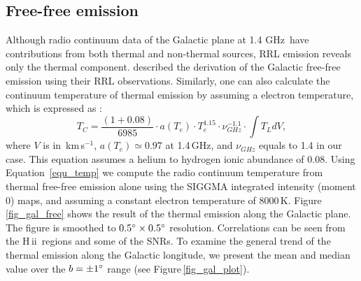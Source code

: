 \documentclass[manuscript]{aastex61}
\newcommand{\hii}{{\rm H\,}{{\sc ii}}}
\newcommand{\kms}{\,km\,s$^{-1}$}
\newcommand{\ghz}{\,GHz}
\begin{document}
\subsection{Free-free emission} \label{sec_gal_free}
Although radio continuum data of the Galactic plane at 1.4\,\ghz\ have contributions from both thermal and non-thermal sources, RRL emission reveals only the thermal component.
\citet{Alves2012} described the derivation of the Galactic free-free emission using their RRL observations.
Similarly, one can also calculate the continuum temperature of thermal emission by assuming a electron temperature, which is expressed as \citep{Mezger1967a, Lockman1978, Quireza2006a}:
\begin{equation}
  T_C=
  \frac{(1+0.08)}{6985}\cdot a(T_e) \cdot T_e^{1.15} \cdot \nu _{GHz}^{-1.1} \cdot \int T_L dV,
  \label{equ_temp}
\end{equation}
where $V$ is in \kms, $a(T_e) \simeq 0.97$ at 1.4\,GHz, and $\nu_{GHz}$ equals to 1.4 in our case.  This equation assumes a helium to hydrogen ionic abundance of 0.08.
Using Equation~\ref{equ_temp} we compute the radio continuum temperature from thermal free-free emission alone using the SIGGMA integrated intensity (moment 0) maps, and assuming a constant electron temperature of 8000\,K.
Figure\,\ref{fig_gal_free} shows the result of the thermal emission along the Galactic plane.
The figure is smoothed to $0.5\mbox{$^\circ$} \times 0.5\mbox{$^\circ$}$ resolution.
Correlations can be seen from the \hii\ regions and some of the SNRs.
To examine the general trend of the thermal emission along the Galactic longitude, we present the mean and median value over the $b=\pm1\mbox{$^\circ$}$ range (see Figure\,\ref{fig_gal_plot}).
\end{document}
